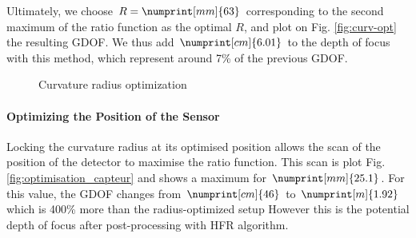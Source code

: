 \documentclass[10pt,letterpaper]{article}
\begin{document}
Ultimately, we choose $R = \numprint[mm]{63}$ corresponding to the second maximum of the ratio function as the optimal $R$, and plot on Fig. \ref{fig:curv-opt} the resulting GDOF. We thus add $\numprint[cm]{6.01}$ to the depth of focus with this method, which represent around 7\% of the previous GDOF.

\begin{figure}[h]
    \centering
	\caption{Curvature radius optimization}
\end{figure}

\paragraph{Optimizing the Position of the Sensor}
Locking the curvature radius at its optimised position allows the scan of the position of the detector to maximise the ratio function. This scan is plot Fig. \ref{fig:optimisation_capteur} and shows a maximum for $\numprint[mm]{25.1}$. For this value, the GDOF changes from $\numprint[cm]{46}$ to $\numprint[m]{1.92}$ which is 400\% more than the radius-optimized setup However this is the potential depth of focus after post-processing with HFR algorithm.
\end{document}
